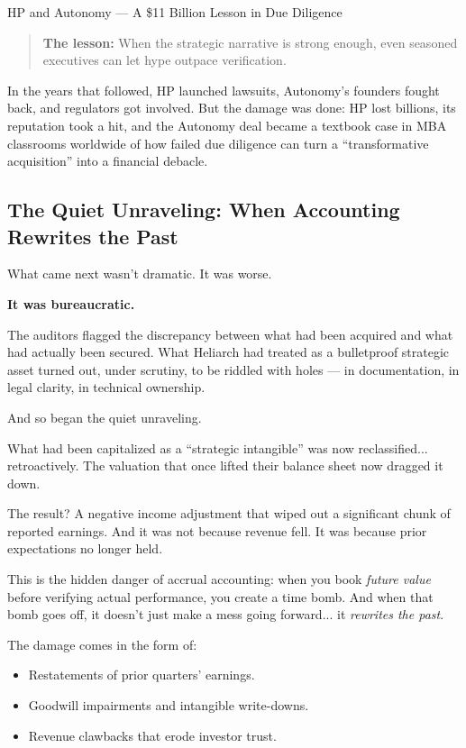 \begin{HistoricalSidebar}{HP and Autonomy --- A \$11 Billion Lesson in Due Diligence}
    \begin{quote}
    \textbf{The lesson:} When the strategic narrative is strong enough, even seasoned executives can let hype outpace verification.
    \end{quote}
    
    In the years that followed, HP launched lawsuits, Autonomy’s founders fought back, and regulators got involved. But the damage was done:
    HP lost billions, its reputation took a hit, and the Autonomy deal became a textbook case in MBA classrooms worldwide of how failed due diligence can turn a “transformative acquisition” into a financial debacle.
    
\end{HistoricalSidebar}

\medskip    

\subsection{The Quiet Unraveling: When Accounting Rewrites the Past}

What came next wasn’t dramatic. It was worse.

\textbf{It was bureaucratic.}

The auditors flagged the discrepancy between what had been acquired and what had actually been secured. What Heliarch had treated as a bulletproof strategic asset turned out, under scrutiny, to be riddled with holes — in documentation, in legal clarity, in technical ownership.

And so began the quiet unraveling.

What had been capitalized as a ``strategic intangible'' was now reclassified... retroactively. 
The valuation that once lifted their balance sheet now dragged it down.

The result? A negative income adjustment that wiped out a significant chunk of reported earnings.
And it was not because revenue fell. It was because prior expectations no longer held.

This is the hidden danger of accrual accounting:
when you book \textit{future value} before verifying actual performance, you create a time bomb.
And when that bomb goes off, it doesn’t just make a mess going forward... it \textit{rewrites the past}.

The damage comes in the form of:

\begin{itemize}
    \item Restatements of prior quarters’ earnings.
    \item Goodwill impairments and intangible write-downs.
    \item Revenue clawbacks that erode investor trust.
\end{itemize}

